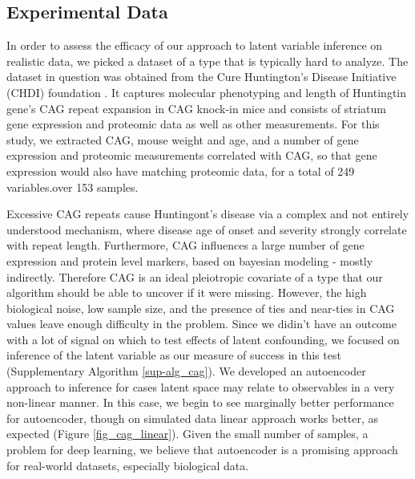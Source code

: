\documentclass{article}
\begin{document}
\subsection{Experimental Data}
In order to assess the efficacy of our approach to latent variable inference on realistic data, we picked a dataset of a type that is typically hard to analyze.  The dataset in question was obtained from the Cure Huntington's Disease Initiative (CHDI) foundation \cite{langfelder_integrated_2016}.  It captures molecular phenotyping and length of Huntingtin gene's CAG repeat expansion in CAG knock-in mice and consists of striatum gene expression and proteomic data as well as other measurements.  For this study, we extracted CAG, mouse weight and age, and a number of gene expression and proteomic measurements correlated with CAG, so that gene expression would also have matching proteomic data, for a total of 249 variables.over 153 samples. 

Excessive CAG repeats cause Huntingont's disease via a complex and not entirely understood mechanism, where disease age of onset and severity strongly correlate with repeat length.  Furthermore, CAG influences a large number of gene expression and protein level markers, based on bayesian modeling - mostly indirectly.  Therefore CAG is an ideal pleiotropic covariate of a type that our algorithm should be able to uncover if it were missing.  However, the high biological noise, low sample size, and the presence of ties and near-ties in CAG values leave enough difficulty in the problem.  Since we didin't have an outcome with a lot of signal on which to test effects of latent confounding, we focused on inference of the latent variable as our measure of success in this test (Supplementary Algorithm \ref{sup-alg_cag}).  We developed an autoencoder approach to inference for cases latent space may relate to observables in a very non-linear manner.  In this case, we begin to see marginally better performance for autoencoder, though on simulated data linear approach works better, as expected (Figure \ref{fig_cag_linear}).  Given the small number of samples, a problem for deep learning, we believe that autoencoder is a promising approach for real-world datasets, especially biological data.
\end{document}
